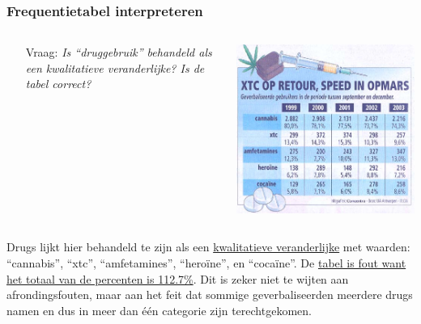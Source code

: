 \documentclass[dutch]{beamer}
\newcommand{\vraag}[1]{\begin{itemize}\item[Vraag:] {\it #1}\end{itemize}}
\begin{document}
\begin{frame}
\frametitle{Frequentietabel interpreteren}
\begin{columns}
\begin{column}{0.6\textwidth}
\vraag{Is “druggebruik” behandeld als een kwalitatieve veranderlijke? Is de tabel correct?}
\end{column}
\begin{column}{0.4\textwidth}
  \includegraphics[width=\textwidth]{tabel-drugs}
\end{column}
\end{columns}
\pause
Drugs lijkt hier behandeld te zijn als een \uline{kwalitatieve veranderlijke} met
waarden: “cannabis”, “xtc”, “amfetamines”, “heroïne”, en “cocaïne”. De \uline{tabel is fout want het totaal van de percenten is 112.7\%}. Dit is zeker niet te
wijten aan afrondingsfouten, maar aan het feit dat sommige geverbaliseerden meerdere drugs namen en dus in meer dan één categorie zijn terechtgekomen.
\end{frame}
\end{document}
